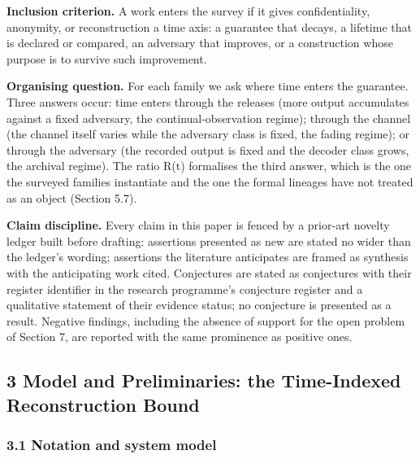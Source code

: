 \documentclass[
  11pt,
]{article}
\begin{document}
\textbf{Inclusion criterion.} A work enters the survey if it gives
confidentiality, anonymity, or reconstruction a time axis: a guarantee
that decays, a lifetime that is declared or compared, an adversary that
improves, or a construction whose purpose is to survive such
improvement.

\textbf{Organising question.} For each family we ask where time enters
the guarantee. Three answers occur: time enters through the releases
(more output accumulates against a fixed adversary, the
continual-observation regime); through the channel (the channel itself
varies while the adversary class is fixed, the fading regime); or
through the adversary (the recorded output is fixed and the decoder
class grows, the archival regime). The ratio R(t) formalises the third
answer, which is the one the surveyed families instantiate and the one
the formal lineages have not treated as an object (Section 5.7).

\textbf{Claim discipline.} Every claim in this paper is fenced by a
prior-art novelty ledger built before drafting: assertions presented as
new are stated no wider than the ledger's wording; assertions the
literature anticipates are framed as synthesis with the anticipating
work cited. Conjectures are stated as conjectures with their register
identifier in the research programme's conjecture register and a
qualitative statement of their evidence status; no conjecture is
presented as a result. Negative findings, including the absence of
support for the open problem of Section 7, are reported with the same
prominence as positive ones.

\subsection{3 Model and Preliminaries: the Time-Indexed Reconstruction
Bound}\label{model-and-preliminaries-the-time-indexed-reconstruction-bound}

\subsubsection{3.1 Notation and system
model}\label{notation-and-system-model}
\end{document}
